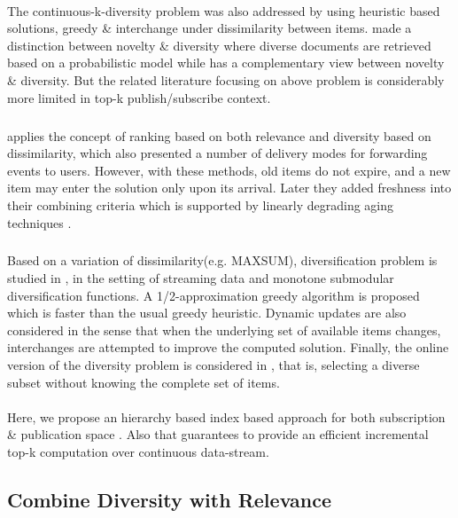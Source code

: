 \documentclass[a4paper,12pt,oneside]{book}
\theoremstyle{definition}
\theoremstyle{remark}
\begin{document}
\paragraph*{}
The continuous-k-diversity problem was also addressed by using heuristic based solutions, greedy \cite{Drosou2009Diversity} \& interchange \cite{Minack2011} under dissimilarity between items. \cite{Clarke2008} made a distinction between novelty \& diversity where diverse documents are retrieved based on a probabilistic model while \cite{Santos2013} has a complementary view between novelty \& diversity. But the related literature focusing on above problem is considerably more limited in top-k publish/subscribe context. 
\subparagraph*{}
\cite{Drosou2009} applies the concept of ranking based on both relevance and diversity based on dissimilarity, which also presented a number of delivery modes for forwarding events to users. However, with these methods, old items do not expire, and a new item may enter the solution only upon its arrival. Later they added freshness into their combining criteria which is supported by linearly degrading aging techniques \cite{Drosou2009workshopp}.
\subparagraph*{}
Based on a variation of dissimilarity(e.g. MAXSUM), diversification problem is studied in \cite{Borodin2012}, in the setting of streaming data and monotone submodular diversification functions. A 1/2-approximation greedy algorithm is proposed which is faster than the usual greedy heuristic. Dynamic updates are also considered in the sense that when the underlying set of available items changes, interchanges are attempted to improve the computed solution. Finally, the online version of the diversity problem is considered in \cite{Panigrahi2012}, that is, selecting a diverse subset without knowing the complete set of items.

\paragraph*{}
Here, we propose an hierarchy based index based approach for both subscription \& publication space . Also that guarantees to provide an efficient incremental top-k computation over continuous data-stream.

\subsection{Combine Diversity with Relevance}
\end{document}
